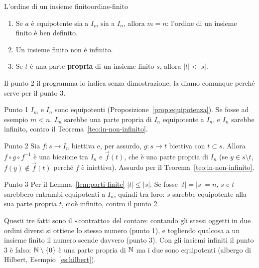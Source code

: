 \begin{concetto}
\begin{Teorema}{L'ordine di un insieme finito}{ordine-finito}
    \begin{prerequisiti}
    \end{prerequisiti}
    \begin{enumerate}
        \item Se $a$ è equipotente sia a $I_m$ sia a $I_n$, allora $m = n$: l'ordine di un insieme finito è ben definito.
        \item Un insieme finito non è infinito.
        \item Se $t$ è una parte \textbf{propria} di un insieme finito $s$, allora $|t| < |s|$.
    \end{enumerate}
\end{Teorema}
\begin{dimostrazione}
    Il punto 2 il programma lo indica senza dimostrazione; la diamo comunque perché serve per il punto 3.
    \begin{caso}{Punto 1}
        $I_m$ e $I_n$ sono equipotenti (Proposizione~\ref{prop:equipotenza}). Se fosse ad esempio $m < n$, $I_m$ sarebbe una parte propria di
        $I_n$ equipotente a $I_n$, e $I_n$ sarebbe infinito, contro il Teorema~\ref{teo:in-non-infinito}.
    \end{caso}
    \begin{caso}{Punto 2}
        Sia $f \colon s \to I_n$ biettiva e, per assurdo, $g \colon s \to t$ biettiva con $t \subset s$. Allora $f \circ g \circ f^{-1}$ è una biezione tra
        $I_n$ e $\overrightarrow{f}(t)$, che è una parte propria di $I_n$ (se $y \in s \setminus t$, $f(y) \notin \overrightarrow{f}(t)$ perché $f$ è
        iniettiva). Assurdo per il Teorema~\ref{teo:in-non-infinito}.
    \end{caso}
    \begin{caso}{Punto 3}
        Per il Lemma~\ref{lem:parti-finite} $|t| \leq |s|$. Se fosse $|t| = |s| = n$, $s$ e $t$ sarebbero entrambi equipotenti a $I_n$, quindi tra loro:
        $s$ sarebbe equipotente alla sua parte propria $t$, cioè infinito, contro il punto 2.
    \end{caso}
\end{dimostrazione}
\end{concetto}

\begin{spiegazione}
    Questi tre fatti sono il «contratto» del contare: contando gli stessi oggetti in due ordini diversi si ottiene lo stesso numero
    (punto 1), e togliendo qualcosa a un insieme finito il numero scende davvero (punto 3). Con gli insiemi infiniti il punto 3 è
    falso: $\mathbb{N} \setminus \{0\}$ è una parte propria di $\mathbb{N}$ ma i due sono equipotenti (albergo di Hilbert, Esempio~\ref{es:hilbert}).
\end{spiegazione}

